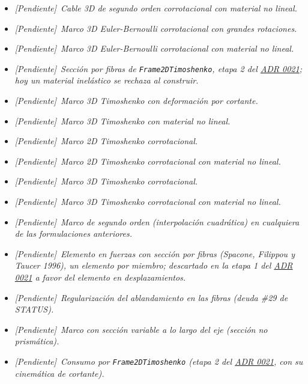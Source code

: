\documentclass[11pt,oneside]{report}
\newcommand{\pendiente}[1]{\textcolor{pendienteorange}{\textit{[Pendiente]}~\textcolor{pendienteorange}{\textit{#1}}}}
\begin{document}
\begin{itemize}
  \item \pendiente{Cable 3D de segundo orden corrotacional con material no lineal.}

  \item \pendiente{Marco 3D Euler-Bernoulli corrotacional con grandes rotaciones.}

  \item \pendiente{Marco 3D Euler-Bernoulli corrotacional con material no lineal.}

  \item \pendiente{Sección por fibras de \texttt{Frame2DTimoshenko}, etapa 2 del \hyperref[adr:0021]{ADR 0021}; hoy un material inelástico se rechaza al construir.}

  \item \pendiente{Marco 3D Timoshenko con deformación por cortante.}

  \item \pendiente{Marco 3D Timoshenko con material no lineal.}

  \item \pendiente{Marco 2D Timoshenko corrotacional.}

  \item \pendiente{Marco 2D Timoshenko corrotacional con material no lineal.}

  \item \pendiente{Marco 3D Timoshenko corrotacional.}

  \item \pendiente{Marco 3D Timoshenko corrotacional con material no lineal.}

  \item \pendiente{Marco de segundo orden (interpolación cuadrática) en cualquiera de las formulaciones anteriores.}

  \item \pendiente{Elemento en fuerzas con sección por fibras (Spacone, Filippou y Taucer 1996), un elemento por miembro; descartado en la etapa 1 del \hyperref[adr:0021]{ADR 0021} a favor del elemento en desplazamientos.}

  \item \pendiente{Regularización del ablandamiento en las fibras (deuda \#29 de STATUS).}

  \item \pendiente{Marco con sección variable a lo largo del eje (sección no prismática).}

  \item \pendiente{Consumo por \texttt{Frame2DTimoshenko} (etapa 2 del \hyperref[adr:0021]{ADR 0021}, con su cinemática de cortante).}


\end{itemize}
\end{document}
